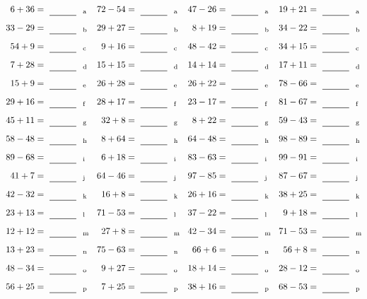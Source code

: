 \documentclass
[
  draft    = true,
  fontsize = 11pt,
  parskip  = half-
]
{scrartcl}
\begin{document}
\clearpage
\begin{align*}
    \pline{6+36}&=\rline{a}
  & \pline{72-54}&=\rline{a}
  & \pline{47-26}&=\rline{a}
  & \pline{19+21}&=\rline{a} \\[1ex]
    \pline{33-29}&=\rline{b}
  & \pline{29+27}&=\rline{b}
  & \pline{8+19}&=\rline{b}
  & \pline{34-22}&=\rline{b} \\[1ex]
    \pline{54+9}&=\rline{c}
  & \pline{9+16}&=\rline{c}
  & \pline{48-42}&=\rline{c}
  & \pline{34+15}&=\rline{c} \\[1ex]
    \pline{7+28}&=\rline{d}
  & \pline{15+15}&=\rline{d}
  & \pline{14+14}&=\rline{d}
  & \pline{17+11}&=\rline{d} \\[1ex]
    \pline{15+9}&=\rline{e}
  & \pline{26+28}&=\rline{e}
  & \pline{26+22}&=\rline{e}
  & \pline{78-66}&=\rline{e} \\[1ex]
    \pline{29+16}&=\rline{f}
  & \pline{28+17}&=\rline{f}
  & \pline{23-17}&=\rline{f}
  & \pline{81-67}&=\rline{f} \\[1ex]
    \pline{45+11}&=\rline{g}
  & \pline{32+8}&=\rline{g}
  & \pline{8+22}&=\rline{g}
  & \pline{59-43}&=\rline{g} \\[1ex]
    \pline{58-48}&=\rline{h}
  & \pline{8+64}&=\rline{h}
  & \pline{64-48}&=\rline{h}
  & \pline{98-89}&=\rline{h} \\[1ex]
    \pline{89-68}&=\rline{i}
  & \pline{6+18}&=\rline{i}
  & \pline{83-63}&=\rline{i}
  & \pline{99-91}&=\rline{i} \\[1ex]
    \pline{41+7}&=\rline{j}
  & \pline{64-46}&=\rline{j}
  & \pline{97-85}&=\rline{j}
  & \pline{87-67}&=\rline{j} \\[1ex]
    \pline{42-32}&=\rline{k}
  & \pline{16+8}&=\rline{k}
  & \pline{26+16}&=\rline{k}
  & \pline{38+25}&=\rline{k} \\[1ex]
    \pline{23+13}&=\rline{l}
  & \pline{71-53}&=\rline{l}
  & \pline{37-22}&=\rline{l}
  & \pline{9+18}&=\rline{l} \\[1ex]
    \pline{12+12}&=\rline{m}
  & \pline{27+8}&=\rline{m}
  & \pline{42-34}&=\rline{m}
  & \pline{71-53}&=\rline{m} \\[1ex]
    \pline{13+23}&=\rline{n}
  & \pline{75-63}&=\rline{n}
  & \pline{66+6}&=\rline{n}
  & \pline{56+8}&=\rline{n} \\[1ex]
    \pline{48-34}&=\rline{o}
  & \pline{9+27}&=\rline{o}
  & \pline{18+14}&=\rline{o}
  & \pline{28-12}&=\rline{o} \\[1ex]
    \pline{56+25}&=\rline{p}
  & \pline{7+25}&=\rline{p}
  & \pline{38+16}&=\rline{p}
  & \pline{68-53}&=\rline{p}
\end{align*}
\end{document}
